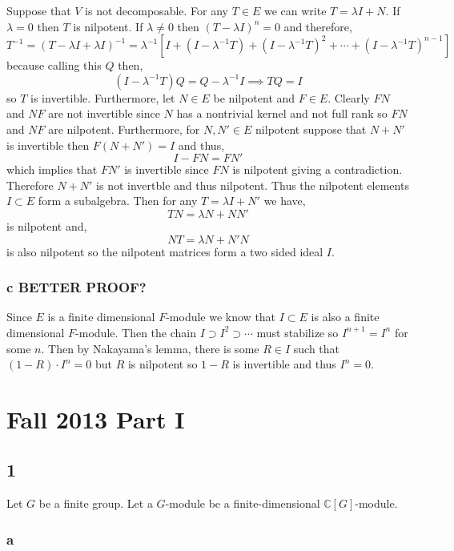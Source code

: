 \documentclass[12pt]{article}
\renewcommand{\C}{\mathbb{C}}
\begin{document}
Suppose that $V$ is not decomposable. For any $T \in E$ we can write $T = \lambda I + N$. If $\lambda = 0$ then $T$ is nilpotent. If $\lambda \neq 0$ then $(T - \lambda I)^n = 0$ and therefore,
\[ T^{-1} = (T - \lambda I + \lambda I)^{-1} = \lambda^{-1} [I + (I - \lambda^{-1} T) + (I - \lambda^{-1} T)^2 + \cdots + (I - \lambda^{-1} T)^{n-1} ] \]
because calling this $Q$ then,
\[ (I - \lambda^{-1} T) Q = Q - \lambda^{-1} I \implies T Q = I \]
so $T$ is invertible. Furthermore, let $N \in E$ be nilpotent and $F \in E$. Clearly $F N$ and $N F$ are not invertible since $N$ has a nontrivial kernel and not full rank so $FN$ and $NF$ are nilpotent. Furthermore, for $N, N' \in E$ nilpotent suppose that $N + N'$ is invertible then $F (N + N') = I$ and thus,
\[ I - F N = F N' \]
which implies that $F N'$ is invertible since $FN$ is nilpotent giving a contradiction. Therefore $N + N'$ is not invertble and thus nilpotent. Thus the nilpotent elements $I \subset E$ form a subalgebra. Then for any $T = \lambda I + N'$ we have,
\[ T N = \lambda N + N N' \]
is nilpotent and,
\[ N T = \lambda N + N' N \]
is also nilpotent so the nilpotent matrices form a two sided ideal $I$.

\subsubsection{c BETTER PROOF?}

Since $E$ is a finite dimensional $F$-module we know that $I \subset E$ is also a finite dimensional $F$-module. Then the chain $I \supset I^2 \supset \cdots$ must stabilize so $I^{n+1} = I^n$ for some $n$. Then by Nakayama's lemma, there is some $R \in I$ such that $(1 - R) \cdot I^n = 0$ but $R$ is nilpotent so $1 - R$ is invertible and thus $I^n = 0$.


\section{Fall 2013 Part I}

\subsection{1}

Let $G$ be a finite group. Let a $G$-module be a finite-dimensional $\C[G]$-module.

\subsubsection{a}
\end{document}
